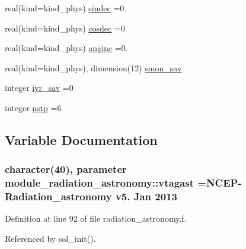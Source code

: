 \begin{DoxyCompactItemize}
\item 
real(kind=kind\+\_\+phys) \hyperlink{group__module__radiation__astronomy_gae195d9c834e2789170f89c988d28b01e}{sindec} =0.
\item 
real(kind=kind\+\_\+phys) \hyperlink{group__module__radiation__astronomy_ga07386e90045639b8023abd826e0e2768}{cosdec} =0.
\item 
real(kind=kind\+\_\+phys) \hyperlink{group__module__radiation__astronomy_ga723159a44491e4ae974128123a1e8dcd}{anginc} =0.
\item 
real(kind=kind\+\_\+phys), dimension(12) \hyperlink{group__module__radiation__astronomy_gab68b4488022a4c6340cb60dca3feff6a}{smon\+\_\+sav}
\item 
integer \hyperlink{group__module__radiation__astronomy_ga83370fbee96388e545a89eb25ed6df90}{iyr\+\_\+sav} =0
\item 
integer \hyperlink{group__module__radiation__astronomy_gab93fe36440da3cc1f1d64cae2ec4c25b}{nstp} =6
\end{DoxyCompactItemize}


\subsection{Variable Documentation}
\subsubsection[{\texorpdfstring{vtagast}{vtagast}}]{\setlength{\rightskip}{0pt plus 5cm}character(40), parameter module\+\_\+radiation\+\_\+astronomy\+::vtagast =\textquotesingle{}N\+C\+EP-\/Radiation\+\_\+astronomy v5. Jan 2013 \textquotesingle{}\hspace{0.3cm}{\ttfamily [private]}}\hypertarget{namespacemodule__radiation__astronomy_aa3497dc9fa4bbd8248fdf0f2784c268a}{}\label{namespacemodule__radiation__astronomy_aa3497dc9fa4bbd8248fdf0f2784c268a}


Definition at line 92 of file radiation\+\_\+astronomy.\+f.



Referenced by sol\+\_\+init().

